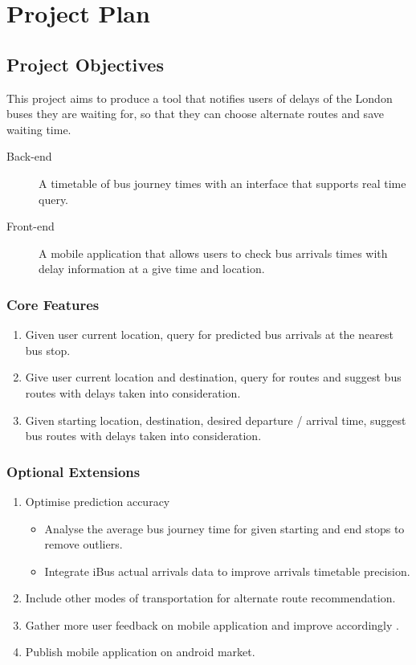 \chapter{Project Plan}

\section{Project Objectives}
This project aims to produce a tool that notifies users of delays of the London buses they are waiting for, so that they can choose alternate routes and save waiting time.

\begin{description}
	\item[Back-end]  A timetable of bus journey times with an interface that supports real time query.
    \item[Front-end] A mobile application that allows users to check bus arrivals times with delay information at a give time and location.
\end{description}

\subsection{Core Features}
    \begin{enumerate}
        \item Given user current location, query for predicted bus arrivals at the nearest bus stop.
 		\item Give user current location and destination, query for routes and suggest bus routes with delays taken into consideration.
        \item Given starting location, destination, desired departure / arrival time, suggest bus routes with delays taken into consideration.
    \end{enumerate}

\subsection{Optional Extensions}
    \begin{enumerate}
    	\item Optimise prediction accuracy
        	\begin{itemize}
            	\item Analyse the average bus journey time for given starting and end stops to remove outliers.
                \item Integrate iBus actual arrivals data to improve arrivals timetable precision.
            \end{itemize}
        \item Include other modes of transportation for alternate route recommendation.
        \item Gather more user feedback on mobile application and improve accordingly .
        \item Publish mobile application on android market.
    \end{enumerate}

